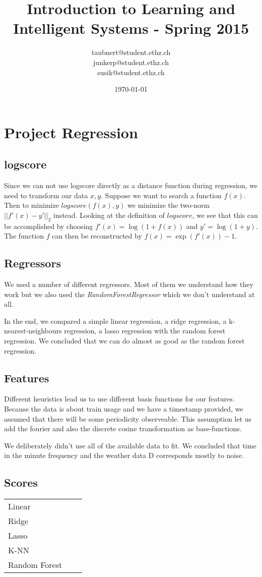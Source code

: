 \documentclass[a4paper, 11pt]{article}
\title{Introduction to Learning and Intelligent Systems - Spring 2015}
\author{taubnert@student.ethz.ch\\ junkerp@student.ethz.ch\\ susik@student.ethz.ch\\}
\date{\today}
\begin{document}
\maketitle

\section{Project Regression}



\subsection{logscore}
Since we can not use logscore directly as a distance function during regression,
we need to transform our data $x,y$.
Suppose we want to search a function $f(x)$.
Then to minimize $logscore(f(x),y)$ we minimize the two-norm $||f'(x) - y'||_2$ instead.
Looking at the definition of $logscore$, we see that this can be accomplished by choosing $f'(x) = \log(1 + f(x))$ and $y' = \log(1 + y)$.
The function $f$ can then be reconstructed by $f(x) = \exp(f'(x)) - 1$.

\subsection{Regressors}
We used a number of different regressors.
Most of them we understand how they work but we also used the \emph{RandomForestRegressor} which we don't understand at all.

In the end, we compared a simple linear regression, a ridge regression, a k-nearest-neighbours regression, a lasso regression with the random forest regression.
We concluded that we can do almost as good as the random forest regression.

\subsection{Features}
Different heuristics lead us to use different basis functions for our features.
Because the data is about train usage and we have a timestamp provided, we assumed that there will be some periodicity observeable.
This assumption let us add the fourier and also the discrete cosine transformation as base-functions.

We deliberately didn't use all of the available data to fit.
We concluded that time in the minute frequency and the weather data D corresponds mostly to noise.

\subsection{Scores}

\begin{tabular}{lll}
Linear        & & \\
Ridge         & & \\
Lasso         & & \\
K-NN          & & \\
Random Forest & &
\end{tabular}
\end{document}
